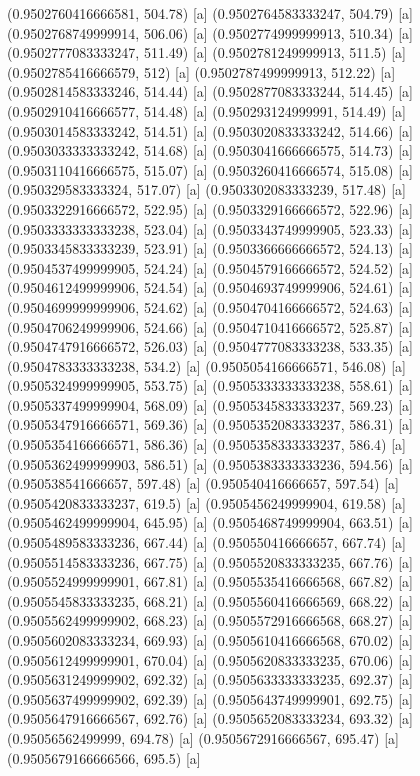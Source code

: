 {{{(0.9502760416666581, 504.78) [a] 
(0.9502764583333247, 504.79) [a] 
(0.9502768749999914, 506.06) [a] 
(0.9502774999999913, 510.34) [a] 
(0.9502777083333247, 511.49) [a] 
(0.9502781249999913, 511.5) [a] 
(0.9502785416666579, 512) [a] 
(0.9502787499999913, 512.22) [a] 
(0.9502814583333246, 514.44) [a] 
(0.9502877083333244, 514.45) [a] 
(0.9502910416666577, 514.48) [a] 
(0.950293124999991, 514.49) [a] 
(0.9503014583333242, 514.51) [a] 
(0.9503020833333242, 514.66) [a] 
(0.9503033333333242, 514.68) [a] 
(0.9503041666666575, 514.73) [a] 
(0.9503110416666575, 515.07) [a] 
(0.9503260416666574, 515.08) [a] 
(0.950329583333324, 517.07) [a] 
(0.9503302083333239, 517.48) [a] 
(0.9503322916666572, 522.95) [a] 
(0.9503329166666572, 522.96) [a] 
(0.9503333333333238, 523.04) [a] 
(0.9503343749999905, 523.33) [a] 
(0.9503345833333239, 523.91) [a] 
(0.9503366666666572, 524.13) [a] 
(0.9504537499999905, 524.24) [a] 
(0.9504579166666572, 524.52) [a] 
(0.9504612499999906, 524.54) [a] 
(0.9504693749999906, 524.61) [a] 
(0.9504699999999906, 524.62) [a] 
(0.9504704166666572, 524.63) [a] 
(0.9504706249999906, 524.66) [a] 
(0.9504710416666572, 525.87) [a] 
(0.9504747916666572, 526.03) [a] 
(0.9504777083333238, 533.35) [a] 
(0.9504783333333238, 534.2) [a] 
(0.9505054166666571, 546.08) [a] 
(0.9505324999999905, 553.75) [a] 
(0.9505333333333238, 558.61) [a] 
(0.9505337499999904, 568.09) [a] 
(0.9505345833333237, 569.23) [a] 
(0.9505347916666571, 569.36) [a] 
(0.9505352083333237, 586.31) [a] 
(0.9505354166666571, 586.36) [a] 
(0.9505358333333237, 586.4) [a] 
(0.9505362499999903, 586.51) [a] 
(0.9505383333333236, 594.56) [a] 
(0.950538541666657, 597.48) [a] 
(0.950540416666657, 597.54) [a] 
(0.9505420833333237, 619.5) [a] 
(0.9505456249999904, 619.58) [a] 
(0.9505462499999904, 645.95) [a] 
(0.9505468749999904, 663.51) [a] 
(0.9505489583333236, 667.44) [a] 
(0.950550416666657, 667.74) [a] 
(0.9505514583333236, 667.75) [a] 
(0.9505520833333235, 667.76) [a] 
(0.9505524999999901, 667.81) [a] 
(0.9505535416666568, 667.82) [a] 
(0.9505545833333235, 668.21) [a] 
(0.9505560416666569, 668.22) [a] 
(0.9505562499999902, 668.23) [a] 
(0.9505572916666568, 668.27) [a] 
(0.9505602083333234, 669.93) [a] 
(0.9505610416666568, 670.02) [a] 
(0.9505612499999901, 670.04) [a] 
(0.9505620833333235, 670.06) [a] 
(0.9505631249999902, 692.32) [a] 
(0.9505633333333235, 692.37) [a] 
(0.9505637499999902, 692.39) [a] 
(0.9505643749999901, 692.75) [a] 
(0.9505647916666567, 692.76) [a] 
(0.9505652083333234, 693.32) [a] 
(0.95056562499999, 694.78) [a] 
(0.9505672916666567, 695.47) [a] 
(0.9505679166666566, 695.5) [a] 
}}}
